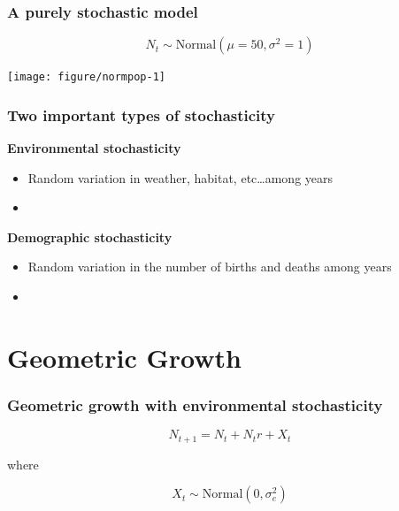 \documentclass[color=usenames,dvipsnames]{beamer}\usepackage[]{graphicx}\usepackage[]{color}
\begin{document}
\begin{frame}[fragile]
  \frametitle{A purely stochastic model}
  \vspace{-3mm}
  \[
    N_t \sim \mbox{Normal}(\mu=50, \sigma^2=1)
  \]
  \vspace{-8mm}

\begin{center}
  \texttt{[image: figure/normpop-1]}
\end{center}
\end{frame}



\begin{frame}
  \frametitle{Two important types of stochasticity}
  {\bf Environmental stochasticity}
  \begin{itemize}
    \item Random variation in weather, habitat, etc\dots among years
    \item[]
  \end{itemize}
  \pause
  {\bf Demographic stochasticity}
  \begin{itemize}
    \item Random variation in the number of births and deaths among years
    \item[]
  \end{itemize}
\end{frame}







\section{Geometric Growth}





\begin{frame}
  \frametitle{Geometric growth with environmental stochasticity}
  \LARGE
\[
  N_{t+1} = N_t + N_tr + X_t
\]

\vspace{0.3cm} \pause
{\large \centering where \par}
\[
  X_t \sim \mbox{Normal}(0, \sigma_e^2)
\]
\end{frame}
\end{document}
